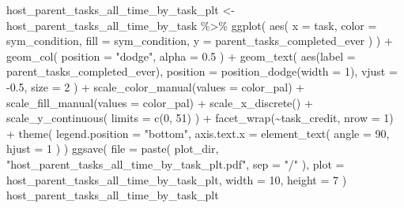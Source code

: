 \documentclass[
]{book}
\newenvironment{Shaded}{\begin{snugshade}}{\end{snugshade}}
\newcommand{\AttributeTok}[1]{\textcolor[rgb]{0.77,0.63,0.00}{#1}}
\newcommand{\DecValTok}[1]{\textcolor[rgb]{0.00,0.00,0.81}{#1}}
\newcommand{\FloatTok}[1]{\textcolor[rgb]{0.00,0.00,0.81}{#1}}
\newcommand{\FunctionTok}[1]{\textcolor[rgb]{0.00,0.00,0.00}{#1}}
\newcommand{\NormalTok}[1]{#1}
\newcommand{\OtherTok}[1]{\textcolor[rgb]{0.56,0.35,0.01}{#1}}
\newcommand{\SpecialCharTok}[1]{\textcolor[rgb]{0.00,0.00,0.00}{#1}}
\newcommand{\StringTok}[1]{\textcolor[rgb]{0.31,0.60,0.02}{#1}}
\begin{document}
\begin{Shaded}
\begin{Highlighting}[]
\NormalTok{host\_parent\_tasks\_all\_time\_by\_task\_plt }\OtherTok{\textless{}{-}}\NormalTok{ host\_parent\_tasks\_all\_time\_by\_task }\SpecialCharTok{\%\textgreater{}\%}
  \FunctionTok{ggplot}\NormalTok{(}
    \FunctionTok{aes}\NormalTok{(}
      \AttributeTok{x =}\NormalTok{ task,}
      \AttributeTok{color =}\NormalTok{ sym\_condition,}
      \AttributeTok{fill =}\NormalTok{ sym\_condition,}
      \AttributeTok{y =}\NormalTok{ parent\_tasks\_completed\_ever}
\NormalTok{    )}
\NormalTok{  ) }\SpecialCharTok{+}
  \FunctionTok{geom\_col}\NormalTok{(}
    \AttributeTok{position =} \StringTok{"dodge"}\NormalTok{,}
    \AttributeTok{alpha =} \FloatTok{0.5}
\NormalTok{  ) }\SpecialCharTok{+}
  \FunctionTok{geom\_text}\NormalTok{(}
    \FunctionTok{aes}\NormalTok{(}\AttributeTok{label =}\NormalTok{ parent\_tasks\_completed\_ever),}
    \AttributeTok{position =} \FunctionTok{position\_dodge}\NormalTok{(}\AttributeTok{width =} \DecValTok{1}\NormalTok{),}
    \AttributeTok{vjust =} \SpecialCharTok{{-}}\FloatTok{0.5}\NormalTok{,}
    \AttributeTok{size =} \DecValTok{2}
\NormalTok{  ) }\SpecialCharTok{+}
  \FunctionTok{scale\_color\_manual}\NormalTok{(}\AttributeTok{values =}\NormalTok{ color\_pal) }\SpecialCharTok{+}
  \FunctionTok{scale\_fill\_manual}\NormalTok{(}\AttributeTok{values =}\NormalTok{ color\_pal) }\SpecialCharTok{+}
  \FunctionTok{scale\_x\_discrete}\NormalTok{() }\SpecialCharTok{+}
  \FunctionTok{scale\_y\_continuous}\NormalTok{(}
    \AttributeTok{limits =} \FunctionTok{c}\NormalTok{(}\DecValTok{0}\NormalTok{, }\DecValTok{51}\NormalTok{)}
\NormalTok{  ) }\SpecialCharTok{+}
  \FunctionTok{facet\_wrap}\NormalTok{(}\SpecialCharTok{\textasciitilde{}}\NormalTok{task\_credit, }\AttributeTok{nrow =} \DecValTok{1}\NormalTok{) }\SpecialCharTok{+}
  \FunctionTok{theme}\NormalTok{(}
    \AttributeTok{legend.position =} \StringTok{"bottom"}\NormalTok{,}
    \AttributeTok{axis.text.x =} \FunctionTok{element\_text}\NormalTok{(}
      \AttributeTok{angle =} \DecValTok{90}\NormalTok{,}
      \AttributeTok{hjust =} \DecValTok{1}
\NormalTok{    )}
\NormalTok{  )}
\FunctionTok{ggsave}\NormalTok{(}
  \AttributeTok{file =} \FunctionTok{paste}\NormalTok{(}
\NormalTok{    plot\_dir,}
    \StringTok{"host\_parent\_tasks\_all\_time\_by\_task\_plt.pdf"}\NormalTok{,}
    \AttributeTok{sep =} \StringTok{"/"}
\NormalTok{  ),}
  \AttributeTok{plot =}\NormalTok{ host\_parent\_tasks\_all\_time\_by\_task\_plt,}
  \AttributeTok{width =} \DecValTok{10}\NormalTok{,}
  \AttributeTok{height =} \DecValTok{7}
\NormalTok{)}
\NormalTok{host\_parent\_tasks\_all\_time\_by\_task\_plt}
\end{Highlighting}
\end{Shaded}
\end{document}
